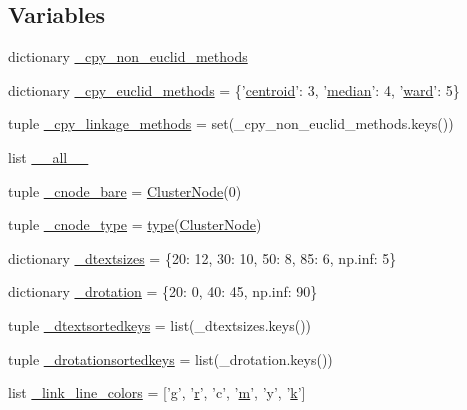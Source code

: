 \subsection*{Variables}
\begin{DoxyCompactItemize}
\item 
dictionary \hyperlink{namespacescipy_1_1cluster_1_1hierarchy_a08000610cd9218a42e8e775811ac3116}{\+\_\+cpy\+\_\+non\+\_\+euclid\+\_\+methods}
\item 
dictionary \hyperlink{namespacescipy_1_1cluster_1_1hierarchy_aed8c8239c572cb5301150e9e3d238b0a}{\+\_\+cpy\+\_\+euclid\+\_\+methods} = \{'\hyperlink{namespacescipy_1_1cluster_1_1hierarchy_a8295ae6d011df53777d384414aa4816a}{centroid}'\+: 3, '\hyperlink{namespacescipy_1_1cluster_1_1hierarchy_a6273676cba44a8b2ffb81a5157e4aadc}{median}'\+: 4, '\hyperlink{namespacescipy_1_1cluster_1_1hierarchy_a46b8f04f0248ca03b03444ebcfb53dd4}{ward}'\+: 5\}
\item 
tuple \hyperlink{namespacescipy_1_1cluster_1_1hierarchy_afa669835643f735862acc3d9690855cc}{\+\_\+cpy\+\_\+linkage\+\_\+methods} = set(\+\_\+cpy\+\_\+non\+\_\+euclid\+\_\+methods.\+keys())
\item 
list \hyperlink{namespacescipy_1_1cluster_1_1hierarchy_a41e5f5137979cd0a60b16d1f0853b6c4}{\+\_\+\+\_\+all\+\_\+\+\_\+}
\item 
tuple \hyperlink{namespacescipy_1_1cluster_1_1hierarchy_a790a0a5417c572c81331a31bfc6d2150}{\+\_\+cnode\+\_\+bare} = \hyperlink{classscipy_1_1cluster_1_1hierarchy_1_1ClusterNode}{Cluster\+Node}(0)
\item 
tuple \hyperlink{namespacescipy_1_1cluster_1_1hierarchy_a28abe10552adf386e64235999e2c5c05}{\+\_\+cnode\+\_\+type} = \hyperlink{fftw__dct_8c_a7aead736a07eaf25623ad7bfa1f0ee2d}{type}(\hyperlink{classscipy_1_1cluster_1_1hierarchy_1_1ClusterNode}{Cluster\+Node})
\item 
dictionary \hyperlink{namespacescipy_1_1cluster_1_1hierarchy_a70c2ab570be16641c7a6c6b8c9888a01}{\+\_\+dtextsizes} = \{20\+: 12, 30\+: 10, 50\+: 8, 85\+: 6, np.\+inf\+: 5\}
\item 
dictionary \hyperlink{namespacescipy_1_1cluster_1_1hierarchy_adc156b5164b7d8ba3654b3f0bc5a41f4}{\+\_\+drotation} = \{20\+: 0, 40\+: 45, np.\+inf\+: 90\}
\item 
tuple \hyperlink{namespacescipy_1_1cluster_1_1hierarchy_a7261f809976b2b79252f0c9119182b4f}{\+\_\+dtextsortedkeys} = list(\+\_\+dtextsizes.\+keys())
\item 
tuple \hyperlink{namespacescipy_1_1cluster_1_1hierarchy_af1462efdb7ea8807e2bc726e282832d1}{\+\_\+drotationsortedkeys} = list(\+\_\+drotation.\+keys())
\item 
list \hyperlink{namespacescipy_1_1cluster_1_1hierarchy_a446dcf1e49353bbdaaf45d973eef5883}{\+\_\+link\+\_\+line\+\_\+colors} = \mbox{[}'g', '\hyperlink{indexexpr_8h_ac434fd11cc2493608d8d91424d60c17e}{r}', 'c', '\hyperlink{indexexpr_8h_ab72fdb4031d47b75ab26dd18a437bcdc}{m}', 'y', '\hyperlink{indexexpr_8h_abb72938a198351550846b37a84588b63}{k}'\mbox{]}
\end{DoxyCompactItemize}


